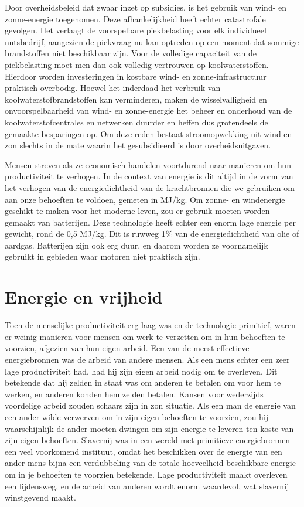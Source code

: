 Door overheidsbeleid dat zwaar inzet op subsidies, is het gebruik van wind- en zonne-energie toegenomen. Deze afhankelijkheid heeft echter catastrofale gevolgen. Het verlaagt de voorspelbare piekbelasting voor elk individueel nutsbedrijf, aangezien de piekvraag nu kan optreden op een moment dat sommige brandstoffen niet beschikbaar zijn. Voor de volledige capaciteit van de piekbelasting moet men dan ook volledig vertrouwen op koolwaterstoffen. Hierdoor worden investeringen in kostbare wind- en zonne-infrastructuur praktisch overbodig. Hoewel het inderdaad het verbruik van koolwaterstofbrandstoffen kan verminderen, maken de wisselvalligheid en onvoorspelbaarheid van wind- en zonne-energie het beheer en onderhoud van de koolwaterstofcentrales en netwerken duurder en heffen dus grotendeels de gemaakte besparingen op. Om deze reden bestaat stroomopwekking uit wind en zon slechts in de mate waarin het gesubsidieerd is door overheidsuitgaven.

Mensen streven als ze economisch handelen voortdurend naar manieren om hun productiviteit te verhogen. In de context van energie is dit altijd in de vorm van het verhogen van de energiedichtheid van de krachtbronnen die we gebruiken om aan onze behoeften te voldoen, gemeten in MJ/kg. Om zonne- en windenergie geschikt te maken voor het moderne leven, zou er gebruik moeten worden gemaakt van batterijen. Deze technologie heeft echter een enorm lage energie per gewicht, rond de 0,5 MJ/kg. Dit is ruwweg 1\% van de energiedichtheid van olie of aardgas. Batterijen zijn ook erg duur, en daarom worden ze voornamelijk gebruikt in gebieden waar motoren niet praktisch zijn.

\vspace{-1em}
\hypertarget{energie-en-vrijheid}{%
\section{Energie en vrijheid}\label{energie-en-vrijheid}}

Toen de menselijke productiviteit erg laag was en de technologie primitief, waren er weinig manieren voor mensen om werk te verzetten om in hun behoeften te voorzien, afgezien van hun eigen arbeid. Een van de meest effectieve energiebronnen was de arbeid van andere mensen. Als een mens echter een zeer lage productiviteit had, had hij zijn eigen arbeid nodig om te overleven. Dit betekende dat hij zelden in staat was om anderen te betalen om voor hem te werken, en anderen konden hem zelden betalen. Kansen voor wederzijds voordelige arbeid zouden schaars zijn in zo\textquotesingle n situatie. Als een man de energie van een ander wilde verwerven om in zijn eigen behoeften te voorzien, zou hij waarschijnlijk de ander moeten dwingen om zijn energie te leveren ten koste van zijn eigen behoeften. Slavernij was in een wereld met primitieve energiebronnen een veel voorkomend instituut, omdat het beschikken over de energie van een ander mens bijna een verdubbeling van de totale hoeveelheid beschikbare energie om in je behoeften te voorzien betekende. Lage productiviteit maakt overleven een lijdensweg, en de arbeid van anderen wordt enorm waardevol, wat slavernij winstgevend maakt.

